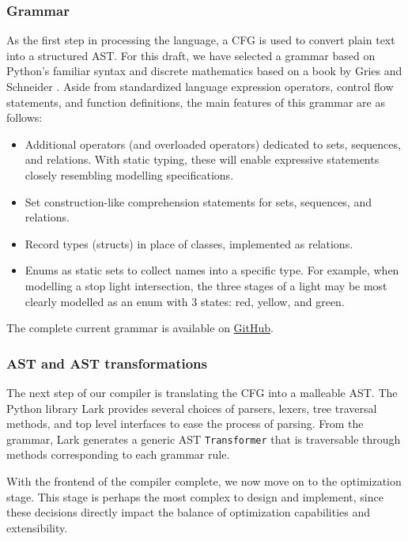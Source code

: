 \documentclass{article}
\begin{document}
\subsubsection{Grammar}

As the first step in processing the language, a CFG is used to convert plain text into a structured AST. For this draft, we have selected a grammar based on Python's familiar syntax \cite{pythonGrammar} and discrete mathematics based on a book by Gries and Schneider \cite{griesAndSchneider}. Aside from standardized language expression operators, control flow statements, and function definitions, the main features of this grammar are as follows:
\begin{itemize}
  \item Additional operators (and overloaded operators) dedicated to sets, sequences, and relations. With static typing, these will enable expressive statements closely resembling modelling specifications.
  \item Set construction-like comprehension statements for sets, sequences, and relations.
  \item Record types (structs) in place of classes, implemented as relations.
  \item Enums as static sets to collect names into a specific type. For example, when modelling a stop light intersection, the three stages of a light may be most clearly modelled as an enum with 3 states: red, yellow, and green.
\end{itemize}

The complete current grammar is available on \href{https://github.com/Ant13731/compilers/blob/main/implementation/grammar.lark}{GitHub}.

\subsubsection{AST and AST transformations}

The next step of our compiler is translating the CFG into a malleable AST. The Python library Lark \cite{lark} provides several choices of parsers, lexers, tree traversal methods, and top level interfaces to ease the process of parsing. From the grammar, Lark generates a generic AST \texttt{Transformer} that is traversable through methods corresponding to each grammar rule.

With the frontend of the compiler complete, we now move on to the optimization stage. This stage is perhaps the most complex to design and implement, since these decisions directly impact the balance of optimization capabilities and extensibility.
\end{document}
